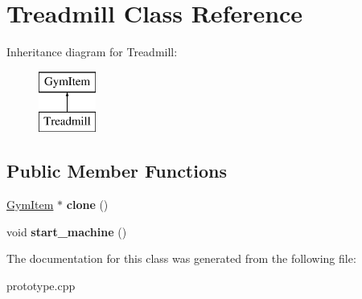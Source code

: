 \hypertarget{class_treadmill}{}\section{Treadmill Class Reference}
\label{class_treadmill}
Inheritance diagram for Treadmill\+:\begin{figure}[H]
\begin{center}
\leavevmode
\includegraphics[height=2.000000cm]{class_treadmill}
\end{center}
\end{figure}
\subsection*{Public Member Functions}
\begin{DoxyCompactItemize}
\item 
\hyperlink{class_gym_item}{Gym\+Item} $\ast$ {\bfseries clone} ()\hypertarget{class_treadmill_ae44ece9910774bfe1161e6831c893fdd}{}\label{class_treadmill_ae44ece9910774bfe1161e6831c893fdd}

\item 
void {\bfseries start\+\_\+machine} ()\hypertarget{class_treadmill_aaa9004a3be6ca94939c901a2d1e48d84}{}\label{class_treadmill_aaa9004a3be6ca94939c901a2d1e48d84}

\end{DoxyCompactItemize}


The documentation for this class was generated from the following file\+:\begin{DoxyCompactItemize}
\item 
prototype.\+cpp\end{DoxyCompactItemize}
